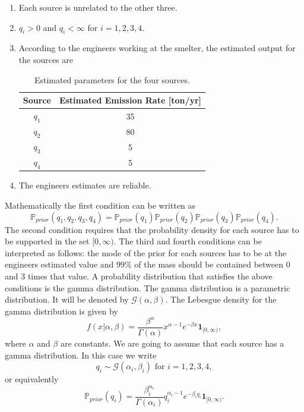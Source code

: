 \documentclass[12pt]{book}
\newcommand{\prior}{\mathbb{P}_{prior}}
\begin{document}
\begin{enumerate}
\item Each source is unrelated to the other three.
\item $q_{i}>0$ and $q_{i}<\infty$ for $i=1,2,3,4$.
\item According to the engineers working at the smelter, the estimated
output for the sources are
\begin{table}[H]
\centering
\begin{tabular}{|c|c|}
\hline 
Source & Estimated Emission Rate {[}ton/yr{]}\tabularnewline
\hline 
\hline 
$q_{1}$ & 35\tabularnewline
\hline 
$q_{2}$ & 80\tabularnewline
\hline 
$q_{3}$ & 5\tabularnewline
\hline 
$q_{4}$ & 5\tabularnewline
\hline 
\end{tabular}
\caption{Estimated parameters for the four sources.}
\label{tabSources}
\end{table}
\item The engineers estimates are reliable.
\end{enumerate}
Mathematically the first condition can be written as
\begin{equation*}
\prior(q_{1},q_{2},q_{3},q_{4})=\prior(q_{1})\prior(q_{2})\prior(q_{3})\prior(q_{4}).
\end{equation*}
The second condition requires that the probability density for each source has to 
be supported in the set $[0,\infty)$. The third and fourth conditions can be interpreted
as follows: the mode of the prior  for each sources has to be at the
engineers estimated value and $99\%$ of the mass should be contained between 0 and 3
times that value. A probability distribution that 
satisfies the above conditions is the gamma distribution. The gamma distribution
is a parametric distribution. It will be 
denoted by $\mathscr{G}(\alpha,\beta)$. The Lebesgue density
for the gamma distribution is given by
\begin{equation*}
f(x|\alpha,\beta)=\frac{\beta^{\alpha}}{\Gamma(\alpha)}x^{\alpha-1}e^{-\beta x}\textbf{1}_{[0,\infty)},
\end{equation*}
where $\alpha$ and $\beta$ are constants. We are going to assume that each source has 
a  gamma distribution. In this case we write
\begin{equation*}
q_{i}\sim \mathscr{G}(\alpha_{i},\beta_{i})\text{ for }{i=1,2,3,4},
\end{equation*}
or equivalently
\begin{equation}\label{eqnPriorq}
\prior(q_{i})=\frac{\beta_{i}^{\alpha_{i}}}{\Gamma(\alpha_{i})}q_{i}^{\alpha_{i}-1}e^{-\beta_{i} q_{i}}\textbf{1}_{[0,\infty)}.
\end{equation}
\end{document}
